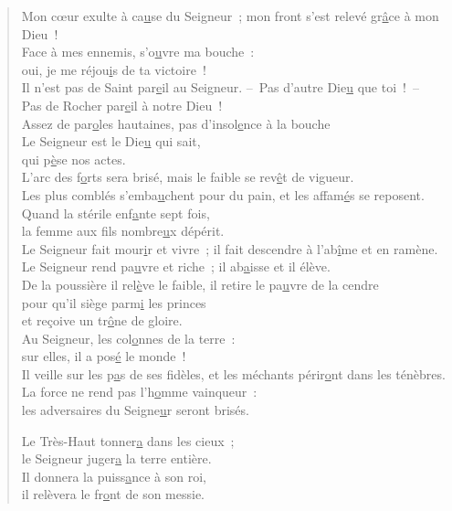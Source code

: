 \begin{verse}
Mon cœur exulte à ca\underline{u}se du Seigneur ;\psalmstar
mon front s'est relevé gr\underline{â}ce à mon Dieu !\\
Face à mes ennemis, s'o\underline{u}vre ma bouche :\\
oui, je me réjou\underline{i}s de ta victoire !\\

Il n'est pas de Saint par\underline{e}il au Seigneur. \psalmdagger
– Pas d'autre Die\underline{u} que toi ! – \psalmstar
Pas de Rocher par\underline{e}il à notre Dieu !\\

Assez de par\underline{o}les hautaines,\psalmstar
pas d'insol\underline{e}nce à la bouche \\
Le Seigneur est le Die\underline{u} qui sait,\\
qui p\underline{è}se nos actes.\\

L'arc des f\underline{o}rts sera brisé,\psalmstar
mais le faible se rev\underline{ê}t de vigueur.\\
Les plus comblés s'emba\underline{u}chent pour du pain,\psalmstar
et les affam\underline{é}s se reposent.\\
Quand la stérile enf\underline{a}nte sept fois,\\
la femme aux fils nombre\underline{u}x dépérit.\\

Le Seigneur fait mour\underline{i}r et vivre ;\psalmstar
il fait descendre à l'ab\underline{î}me et en ramène.\\
Le Seigneur rend pa\underline{u}vre et riche ;\psalmstar
il ab\underline{a}isse et il élève.\\

De la poussière il rel\underline{è}ve le faible,\psalmstar
il retire le pa\underline{u}vre de la cendre\\
pour qu'il siège parm\underline{i} les princes\\
et reçoive un tr\underline{ô}ne de gloire.\\

Au Seigneur, les col\underline{o}nnes de la terre :\\
sur elles, il a pos\underline{é} le monde !\\
Il veille sur les p\underline{a}s de ses fidèles,\psalmstar
et les méchants périr\underline{o}nt dans les ténèbres.\\
La force ne rend pas l'h\underline{o}mme vainqueur :\\
les adversaires du Seigne\underline{u}r seront brisés.\psalmstar

Le Très-Haut tonner\underline{a} dans les cieux ;\\
le Seigneur juger\underline{a} la terre entière.\\
Il donnera la puiss\underline{a}nce à son roi,\\
il relèvera le fr\underline{o}nt de son messie.
\end{verse}

